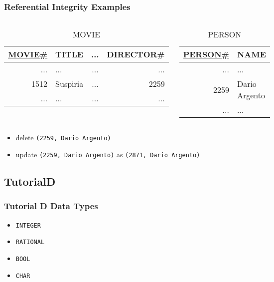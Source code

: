 \documentclass[dvipsnames]{beamer}
\theoremstyle{plain}
\begin{document}
\begin{frame}
  \frametitle{Referential Integrity Examples}

  \begin{columns}[t]
    \begin{footnotesize}
    \begin{table}
      \caption{MOVIE}
      \begin{tabular}{|r|l|c|r|}\hline
\underline{MOVIE\#} & TITLE & ... & DIRECTOR\#\\[2pt]\hline\hline
                ... & ...      & ... &        ...\\\hline
               1512 & Suspiria & ... &       2259\\\hline
                ... & ...      & ... &        ...\\\hline
      \end{tabular}
    \end{table}
    \end{footnotesize}

    \begin{footnotesize}
    \begin{table}
      \caption{PERSON}
      \begin{tabular}{|r|l|}\hline
\underline{PERSON\#} & NAME\\[2pt]\hline\hline
        ... & ...          \\\hline
       2259 & Dario Argento\\\hline
        ... & ...          \\\hline
      \end{tabular}
    \end{table}
    \end{footnotesize}
  \end{columns}

  \begin{itemize}
    \item delete \texttt{(2259, Dario Argento)}
    \item update \texttt{(2259, Dario Argento)} as \texttt{(2871, Dario Argento)}
  \end{itemize}
\end{frame}

\subsection{TutorialD}

\begin{frame}
  \frametitle{Tutorial D Data Types}

  \begin{itemize}
    \item \texttt{INTEGER}
    \item \texttt{RATIONAL}
    \item \texttt{BOOL}
    \item \texttt{CHAR}
  \end{itemize}
\end{frame}
\end{document}
